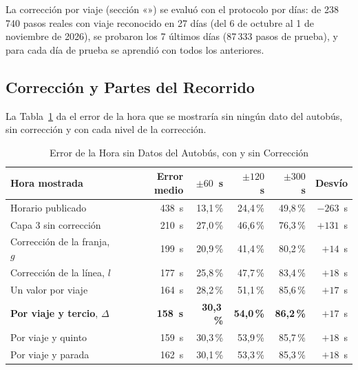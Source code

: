 La corrección por viaje (sección «») se evaluó con el protocolo por días: de 238\,740
pasos reales con viaje reconocido en 27 días (del 6 de octubre al 1 de noviembre de 2026), se probaron los 7 últimos
días (87\,333 pasos de prueba), y para cada día de prueba se aprendió con todos los anteriores.

\subsection{Corrección y Partes del Recorrido}

La Tabla~\ref{tab:correccion} da el error de la hora que se mostraría sin ningún dato del autobús, sin corrección y
con cada nivel de la corrección.

\begin{table}[ht]
\centering
\caption{Error de la Hora sin Datos del Autobús, con y sin Corrección}\label{tab:correccion}
\begin{tabular}{@{}lrrrrr@{}}
\toprule
Hora mostrada & Error medio & $\pm60$~s & $\pm120$~s & $\pm300$~s & Desvío\\
\midrule
Horario publicado & 438~s & 13,1\,\% & 24,4\,\% & 49,8\,\% & $-263$~s\\
Capa 3 sin corrección & 210~s & 27,0\,\% & 46,6\,\% & 76,3\,\% & $+131$~s\\
Corrección de la franja, $g$ & 199~s & 20,9\,\% & 41,4\,\% & 80,2\,\% & $+14$~s\\
Corrección de la línea, $l$ & 177~s & 25,8\,\% & 47,7\,\% & 83,4\,\% & $+18$~s\\
Un valor por viaje & 164~s & 28,2\,\% & 51,1\,\% & 85,6\,\% & $+17$~s\\
\textbf{Por viaje y tercio}, $\Delta$ & \textbf{158~s} & \textbf{30,3\,\%} & \textbf{54,0\,\%} & \textbf{86,2\,\%} & $+17$~s\\
Por viaje y quinto & 159~s & 30,3\,\% & 53,9\,\% & 85,7\,\% & $+18$~s\\
Por viaje y parada & 162~s & 30,1\,\% & 53,3\,\% & 85,3\,\% & $+18$~s\\
\bottomrule
\end{tabular}
\end{table}

